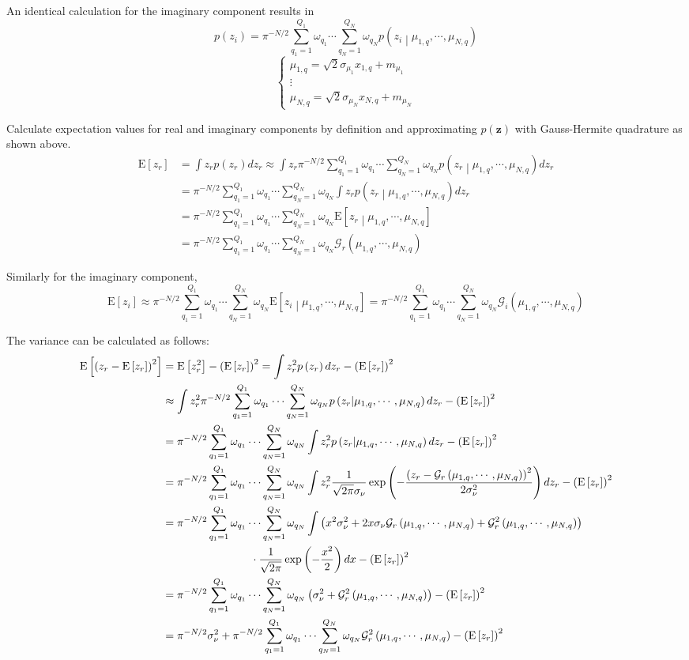 \documentclass{article}         %
\theoremstyle{definition}
\theoremstyle{remark}
\newcommand{\eq}[1]{\begin{equation} #1 \end{equation}}
\newcommand{\al}[1]{\begin{align} #1 \end{align}}
\newcommand{\zbf}{\mathbf{z}}
\newcommand{\Gscript}{\mathcal{G}}
\newcommand{\paren}[1]{\left(#1\right)}
\newcommand{\arr}[2]{\begin{array}{#1} #2 \end{array}}
\newcommand{\expect}[1]{\mathrm{E}\left[#1\right]}
\newcommand{\sumqone}{\sum\limits_{q_1=1}^{Q_1}}
\newcommand{\sumqN}{\sum\limits_{q_N=1}^{Q_N}}
\newcommand{\qq}{\qquad\qquad}
\newcommand{\normpdf}[3]{\frac{1}{\sqrt{2\pi}#3}\exp\paren{-\frac{\paren{#1-#2}^2}{2#3^2}}}
\begin{document}
An identical calculation for the imaginary component results in
\eq{p\paren{z_i} = \pi^{-N/2}\sumqone\omega_{q_1}\cdots\sumqN\omega_{q_N}p\paren{z_i\middle|\mu_{1,q},\cdots,\mu_{N,q}}}
\eq{\left\{\arr{l}{\mu_{1,q} = \sqrt{2}\sigma_{\mu_1}x_{1,q}+m_{\mu_1} \\ \vdots \\ \mu_{N,q} = \sqrt{2}\sigma_{\mu_N}x_{N,q}+m_{\mu_N}}\right.}

Calculate expectation values for real and imaginary components by definition and approximating $p\paren{\zbf}$ with Gauss-Hermite quadrature as shown above.
\al{\expect{z_r} &= \int z_r p\paren{z_r}dz_r \approx \int z_r\pi^{-N/2}\sumqone\omega_{q_1}\cdots\sumqN\omega_{q_N}p\paren{z_r\middle|\mu_{1,q},\cdots,\mu_{N,q}}dz_r \\
&= \pi^{-N/2}\sumqone\omega_{q_1}\cdots\sumqN\omega_{q_N}\int z_rp\paren{z_r\middle|\mu_{1,q},\cdots,\mu_{N,q}}dz_r \\
&=\pi^{-N/2}\sumqone\omega_{q_1}\cdots\sumqN\omega_{q_N}\expect{z_r\middle|\mu_{1,q},\cdots,\mu_{N,q}} \\
&= \pi^{-N/2}\sumqone\omega_{q_1}\cdots\sumqN\omega_{q_N}\Gscript_r\paren{\mu_{1,q},\cdots,\mu_{N,q}}}

Similarly for the imaginary component,
\eq{\expect{z_i} \approx \pi^{-N/2}\sumqone\omega_{q_1}\cdots\sumqN\omega_{q_N}\expect{z_i\middle|\mu_{1,q},\cdots,\mu_{N,q}} = \pi^{-N/2}\sumqone\omega_{q_1}\cdots\sumqN\omega_{q_N}\Gscript_i\paren{\mu_{1,q},\cdots,\mu_{N,q}}}

The variance can be calculated as follows:
\al{\expect{\paren{z_r-\expect{z_r}}^2} &= \expect{z_r^2}-\paren{\expect{z_r}}^2 = \int z_r^2p\paren{z_r}dz_r-\paren{\expect{z_r}}^2 \\
&\approx \int z_r^2\pi^{-N/2}\sumqone\omega_{q_1}\cdots\sumqN\omega_{q_N}p\paren{z_r|\mu_{1,q},\cdots,\mu_{N,q}}dz_r-\paren{\expect{z_r}}^2 \\
&= \pi^{-N/2}\sumqone\omega_{q_1}\cdots\sumqN\omega_{q_N}\int z_r^2p\paren{z_r|\mu_{1,q},\cdots,\mu_{N,q}}dz_r-\paren{\expect{z_r}}^2 \\
&= \pi^{-N/2}\sumqone\omega_{q_1}\cdots\sumqN\omega_{q_N}\int z_r^2\normpdf{z_r}{\Gscript_r\paren{\mu_{1,q},\cdots,\mu_{N,q}}}{\sigma_\nu}dz_r-\paren{\expect{z_r}}^2 \\
&= \pi^{-N/2}\sumqone\omega_{q_1}\cdots\sumqN\omega_{q_N}\int\paren{x^2\sigma_\nu^2+2x\sigma_\nu\Gscript_r\paren{\mu_{1,q},\cdots,\mu_{N,q}}+\Gscript_r^2\paren{\mu_{1,q},\cdots,\mu_{N,q}}} \notag \\
&\qq\qq\cdot\frac{1}{\sqrt{2\pi}}\exp\paren{-\frac{x^2}{2}}dx-\paren{\expect{z_r}}^2 \\
&= \pi^{-N/2}\sumqone\omega_{q_1}\cdots\sumqN\omega_{q_N}\paren{\sigma_\nu^2+\Gscript_r^2\paren{\mu_{1,q},\cdots,\mu_{N,q}}}-\paren{\expect{z_r}}^2 \\
&= \pi^{-N/2}\sigma_\nu^2+\pi^{-N/2}\sumqone\omega_{q_1}\cdots\sumqN\omega_{q_N}\Gscript_r^2\paren{\mu_{1,q},\cdots,\mu_{N,q}}-\paren{\expect{z_r}}^2}
\end{document}
